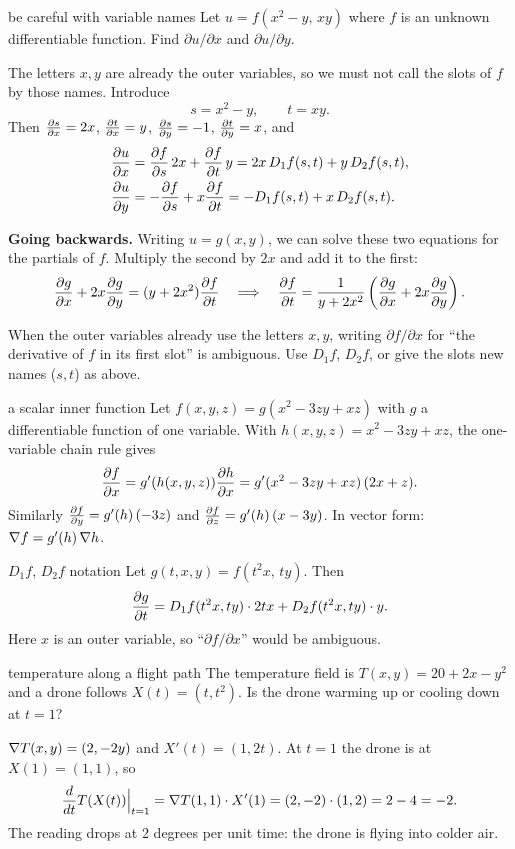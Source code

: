 \begin{example}{be careful with variable names}
Let $u=f(x^2-y,\,xy)$ where $f$ is an unknown differentiable function. Find
$\partial u/\partial x$ and $\partial u/\partial y$.

The letters $x,y$ are already the outer variables, so we must not call the slots of $f$
by those names. Introduce
\[ s=x^2-y,\qquad t=xy . \]
Then $\frac{\partial s}{\partial x}=2x$, $\frac{\partial t}{\partial x}=y$, $\frac{\partial s}{\partial y}=-1$, $\frac{\partial t}{\partial y}=x$, and
\begin{align*}
\frac{\partial u}{\partial x}&=\frac{\partial f}{\partial s}\,2x+\frac{\partial f}{\partial t}\,y=2x\,D_1f(s,t)+y\,D_2f(s,t),\\
\frac{\partial u}{\partial y}&=-\frac{\partial f}{\partial s}+x\frac{\partial f}{\partial t}=-D_1f(s,t)+x\,D_2f(s,t).
\end{align*}

\textbf{Going backwards.} Writing $u=g(x,y)$, we can solve these two equations for the
partials of $f$. Multiply the second by $2x$ and add it to the first:
\[
\frac{\partial g}{\partial x}+2x\frac{\partial g}{\partial y}=(y+2x^2)\frac{\partial f}{\partial t}\quad\Longrightarrow\quad
\frac{\partial f}{\partial t}=\frac{1}{y+2x^2}\left(\frac{\partial g}{\partial x}+2x\frac{\partial g}{\partial y}\right).
\]
\end{example}

\begin{trap}
When the outer variables already use the letters $x,y$, writing $\partial f/\partial x$
for ``the derivative of $f$ in its first slot'' is ambiguous. Use $D_1f$, $D_2f$, or give
the slots new names ($s,t$) as above.
\end{trap}

\begin{example}{a scalar inner function}
Let $f(x,y,z)=g(x^2-3zy+xz)$ with $g$ a differentiable function of one variable. With
$h(x,y,z)=x^2-3zy+xz$, the one-variable chain rule gives
\[
\frac{\partial f}{\partial x}=g'(h(x,y,z))\frac{\partial h}{\partial x}=g'(x^2-3zy+xz)\,(2x+z).
\]
Similarly $\frac{\partial f}{\partial y}=g'(h)\,(-3z)$ and $\frac{\partial f}{\partial z}=g'(h)\,(x-3y)$. In vector form:
$\nabla f=g'(h)\,\nabla h$.
\end{example}

\begin{example}{$D_1f$, $D_2f$ notation}
Let $g(t,x,y)=f(t^2x,\,ty)$. Then
\[
\frac{\partial g}{\partial t}=D_1f(t^2x,ty)\cdot 2tx+D_2f(t^2x,ty)\cdot y .
\]
Here $x$ is an outer variable, so ``$\partial f/\partial x$'' would be ambiguous.
\end{example}

\begin{example}{temperature along a flight path}
The temperature field is $T(x,y)=20+2x-y^2$ and a drone follows $X(t)=(t,t^2)$. Is the
drone warming up or cooling down at $t=1$?

$\nabla T(x,y)=(2,-2y)$ and $X'(t)=(1,2t)$. At $t=1$ the drone is at $X(1)=(1,1)$, so
\[
\frac{d}{dt}T(X(t))\Big|_{t=1}=\nabla T(1,1)\cdot X'(1)=(2,-2)\cdot(1,2)=2-4=-2 .
\]
The reading drops at $2$ degrees per unit time: the drone is flying into colder air.
\end{example}

